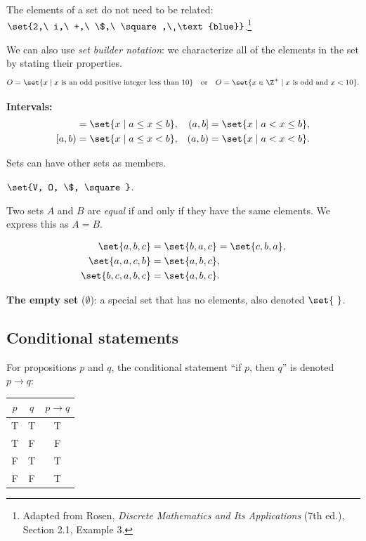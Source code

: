 \begin{example}
The elements of a set do not need to be related: $\set{2,\ i,\ +,\ \$,\ \square,\ \text{blue}}$.\footnote{Adapted from Rosen, \emph{Discrete Mathematics and Its Applications} (7th ed.), Section 2.1, Example 3.}
\end{example}

We can also use \emph{set builder notation}: we characterize all of the elements in the set by stating their properties.
\[
O = \set{x \mid x \text{ is an odd positive integer less than } 10}
\quad\text{or}\quad
O = \set{x \in \Z^{+} \mid x \text{ is odd and } x < 10}.
\]

\textbf{Intervals:}
\begin{align*}
[a,b] &= \set{x \mid a \le x \le b}, & (a,b] &= \set{x \mid a < x \le b},\\
[a,b) &= \set{x \mid a \le x < b}, & (a,b) &= \set{x \mid a < x < b}.
\end{align*}

Sets can have other sets as members.
\begin{example}
$\set{V, O, \$, \square}$.
\end{example}

Two sets $A$ and $B$ are \emph{equal} if and only if they have the same elements. We express this as $A = B$.

\begin{example}
\begin{align*}
\set{a,b,c} &= \set{b,a,c} = \set{c,b,a},\\
\set{a,a,c,b} &= \set{a,b,c},\\
\set{b,c,a,b,c} &= \set{a,b,c}.
\end{align*}
\end{example}

\textbf{The empty set} ($\emptyset$): a special set that has no elements, also denoted $\set{\ }$.

\subsection{Conditional statements}
For propositions $p$ and $q$, the conditional statement ``if $p$, then $q$'' is denoted $p \to q$:
\begin{center}
\begin{tabular}{cc|c}
$p$ & $q$ & $p\to q$\\ \hline
T & T & T\\
T & F & F\\
F & T & T\\
F & F & T
\end{tabular}
\end{center}

